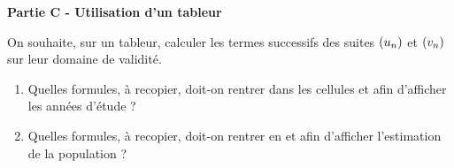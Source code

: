 \documentclass[a4paper,11pt]{article}
\begin{document}
\textbf{Partie C - Utilisation d'un tableur}

\smallskip

On souhaite, sur un tableur, calculer les termes successifs des suites $\suiten$ et $\suiten[v]$ sur leur domaine de validité.
%
\begin{center}
\end{center}
%
\begin{enumerate}
	\item Quelles formules, à recopier, doit-on rentrer dans les cellules  et  afin d'afficher les années d'étude ?
	\item Quelles formules, à recopier, doit-on rentrer en  et  afin d'afficher l'estimation de la population ?
\end{enumerate}
\end{document}
